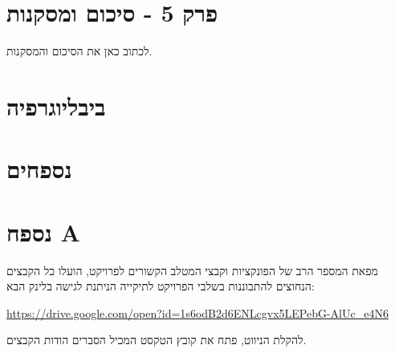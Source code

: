 \documentclass[12pt]{book}
\numberwithin{equation}{section}
\numberwithin{figure}{section}
\numberwithin{table}{section}
\begin{document}
\newpage
\setcounter{page}{1}
\newpage

\renewcommand{\baselinestretch}{2}


\setcounter{chapter}{1}

\newpage
\setcounter{chapter}{2}

\newpage
\setcounter{chapter}{3}

\newpage
\setcounter{chapter}{4}

\newpage

\section*{\centering פרק 5 - סיכום ומסקנות}

לכתוב כאן את הסיכום והמסקנות.

\newpage


\section*{\centering ביבליוגרפיה}





\newpage

\renewcommand{\thepage}{A-\arabic{page}}
\setcounter{page}{1}
\section*{\centering נספחים}

\section*{נספח A}
מפאת המספר הרב של הפונקציות וקבצי המטלב הקשורים לפרויקט, הועלו כל הקבצים הנחוצים להתבוננות בשלבי הפרויקט לתיקייה הניתנת לגישה בלינק הבא: 

\url{https://drive.google.com/open?id=1s6odB2d6ENLcgvx5LEPebG-AlUc_e4N6}

להקלת הניווט, פתח את קובץ הטקסט המכיל הסברים הודות הקבצים.
\end{document}
